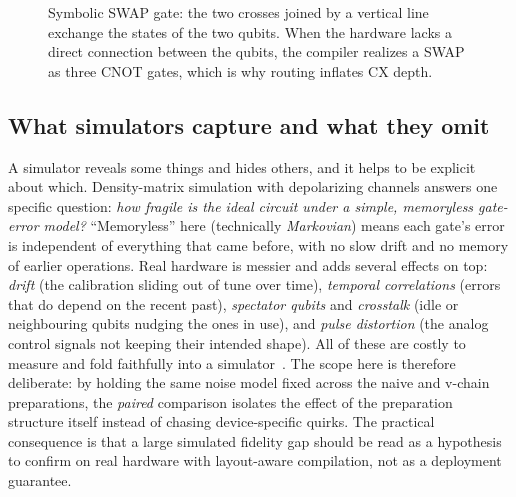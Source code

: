 \begin{figure}[htbp]
\centering
{}
\caption{Symbolic SWAP gate: the two crosses joined by a vertical line exchange the states of the two qubits. When the hardware lacks a direct connection between the qubits, the compiler realizes a SWAP as three CNOT gates, which is why routing inflates CX depth.}
\label{fig:tikz-swap}
\end{figure}

\subsection{What simulators capture and what they omit}
A simulator reveals some things and hides others, and it helps to be explicit about which. Density-matrix simulation with depolarizing channels answers one specific question: \emph{how fragile is the ideal circuit under a simple, memoryless gate-error model?} ``Memoryless'' here (technically \emph{Markovian}) means each gate's error is independent of everything that came before, with no slow drift and no memory of earlier operations. Real hardware is messier and adds several effects on top: \emph{drift} (the calibration sliding out of tune over time), \emph{temporal correlations} (errors that do depend on the recent past), \emph{spectator qubits} and \emph{crosstalk} (idle or neighbouring qubits nudging the ones in use), and \emph{pulse distortion} (the analog control signals not keeping their intended shape). All of these are costly to measure and fold faithfully into a simulator~\cite{Preskill2018NISQ,Geng2023ImprovedFRQI}. The scope here is therefore deliberate: by holding the same noise model fixed across the naive and v-chain preparations, the \emph{paired} comparison isolates the effect of the preparation structure itself instead of chasing device-specific quirks. The practical consequence is that a large simulated fidelity gap should be read as a hypothesis to confirm on real hardware with layout-aware compilation, not as a deployment guarantee.

